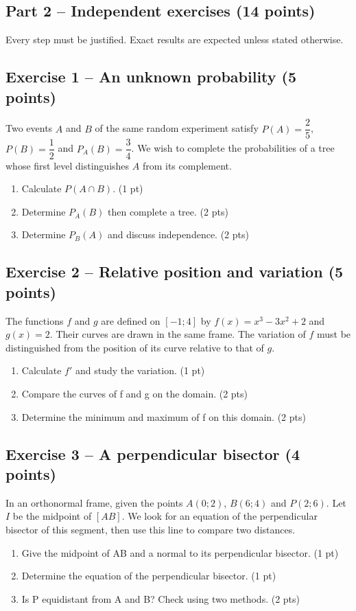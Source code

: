 \mxnewpage\subsection*{Part 2 -- Independent exercises (14 points)}
Every step must be justified. Exact results are expected unless stated otherwise.
\subsection*{Exercise 1 -- An unknown probability (5 points)}
Two events $A$ and $B$ of the same random experiment satisfy $P(A)=\dfrac25$, $P(B)=\dfrac12$ and $P_A(B)=\dfrac34$. We wish to complete the probabilities of a tree whose first level distinguishes $A$ from its complement.
\begin{enumerate}
\item Calculate $P(A\cap B)$. \hfill(1 pt)
\item Determine $P_{\overline A}(B)$ then complete a tree. \hfill(2 pts)
\item Determine $P_B(A)$ and discuss independence. \hfill(2 pts)
\end{enumerate}
\subsection*{Exercise 2 -- Relative position and variation (5 points)}
The functions $f$ and $g$ are defined on $[-1;4]$ by $f(x)=x^3-3x^2+2$ and $g(x)=2$. Their curves are drawn in the same frame. The variation of $f$ must be distinguished from the position of its curve relative to that of $g$.
\begin{enumerate}
\item Calculate $f\prime$ and study the variation. \hfill(1 pt)
\item Compare the curves of f and g on the domain. \hfill(2 pts)
\item Determine the minimum and maximum of f on this domain. \hfill(2 pts)
\end{enumerate}
\subsection*{Exercise 3 -- A perpendicular bisector (4 points)}
In an orthonormal frame, given the points $A(0;2)$, $B(6;4)$ and $P(2;6)$. Let $I$ be the midpoint of $[AB]$. We look for an equation of the perpendicular bisector of this segment, then use this line to compare two distances.
\begin{enumerate}
\item Give the midpoint of AB and a normal to its perpendicular bisector. \hfill(1 pt)
\item Determine the equation of the perpendicular bisector. \hfill(1 pt)
\item Is P equidistant from A and B? Check using two methods. \hfill(2 pts)
\end{enumerate}
